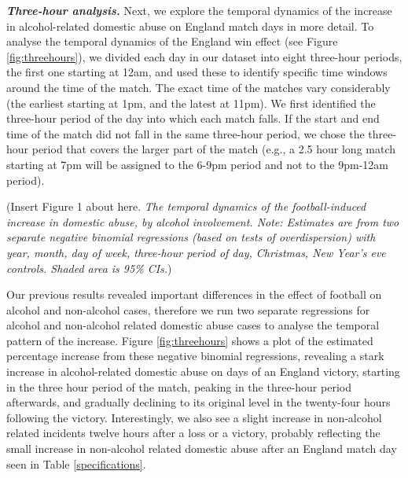 \documentclass[12pt, a4paper]{article}
\begin{document}
\textbf{\textit{Three-hour analysis.}} Next, we explore the temporal dynamics of the increase in alcohol-related domestic abuse on England match days in more detail. To analyse the temporal dynamics of the England win effect (see Figure \ref{fig:threehours}), we divided each day in our dataset into eight three-hour periods, the first one starting at 12am, and used these to identify specific time windows around the time of the match. The exact time of the matches vary considerably (the earliest starting at 1pm, and the latest at 11pm). We first identified the three-hour period of the day into which each match falls. If the start and end time of the match did not fall in the same three-hour period, we chose the three-hour period that covers the larger part of the match (e.g., a 2.5 hour long match starting at 7pm will be assigned to the 6-9pm period and not to the 9pm-12am period).



\vspace{50px}
\begin{center}
(Insert Figure 1 about here. \textit{The temporal dynamics of the football-induced increase in domestic abuse, by alcohol involvement. Note: Estimates are from two separate negative binomial regressions (based on tests of overdispersion) with year, month, day of week, three-hour period of day, Christmas, New Year's eve controls. Shaded area is 95\% CIs.})
\end{center}
\vspace{50px}


Our previous results revealed important differences in the effect of football on alcohol and non-alcohol cases, therefore we run two separate regressions for alcohol and non-alcohol related domestic abuse cases to analyse the temporal pattern of the increase. Figure \ref{fig:threehours} shows a plot of the estimated percentage increase from these negative binomial regressions, revealing a stark increase in alcohol-related domestic abuse on days of an England victory, starting in the three hour period of the match, peaking in the three-hour period afterwards, and gradually declining to its original level in the twenty-four hours following the victory. Interestingly, we also see a slight increase in non-alcohol related incidents twelve hours after a loss or a victory, probably reflecting the small increase in non-alcohol related domestic abuse after an England match day seen in Table \ref{specifications}.
\end{document}
